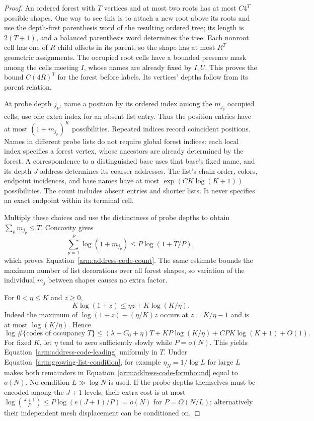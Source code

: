 \begin{proof}
An ordered forest with $T$ vertices and at most two roots has at most
$C4^T$ possible shapes.  One way to see this is to attach a new root
above its roots and use the depth-first parenthesis word of the
resulting ordered tree; its length is $2(T+1)$, and a balanced
parenthesis word determines the tree.  Each nonroot cell has one of
$R$ child offsets in its parent, so the shape has at most $R^T$
geometric assignments.  The occupied root cells have a bounded presence
mask among the cells meeting $I$, whose names are already fixed by
$I,U$.  This proves the bound $C(4R)^T$ for the forest before labels.
Its vertices' depths follow from its parent relation.

At probe depth $j_p$, name a position by its ordered index among the
$m_{j_p}$ occupied cells; use one extra index for an absent list entry.
Thus the position entries have at most $(1+m_{j_p})^K$ possibilities.
Repeated indices record coincident positions.  Names in different
probe lists do not require global forest indices: each local index
specifies a forest vertex, whose ancestors are already determined by
the forest.  A correspondence to a distinguished base uses that base's
fixed name, and its depth-$J$ address determines its coarser addresses.
The list's chain order, colors, endpoint incidences, and base names have
at most $\exp(CK\log(K+1))$ possibilities.  The count includes absent
entries and shorter lists.  It never specifies an exact endpoint
within its terminal cell.

Multiply these choices and use the distinctness of probe depths to
obtain $\sum_p m_{j_p}\leq T$.  Concavity gives
\[
 \sum_{p=1}^P\log(1+m_{j_p})
 \leq P\log(1+T/P),
\]
which proves Equation~\eqref{arm:address-code-count}.  The same estimate
bounds the maximum number of list decorations over all forest shapes,
so variation of the individual $m_j$ between shapes causes no extra
factor.

For $0<\eta\leq K$ and $z\geq0$,
\[
 K\log(1+z)\leq\eta z+K\log(K/\eta).
\]
Indeed the maximum of $\log(1+z)-(\eta/K)z$ occurs at
$z=K/\eta-1$ and is at most $\log(K/\eta)$.  Hence
\begin{equation}\label{arm:address-code-formbound}
 \log\#\{\text{codes of occupancy }T\}
 \leq(\lambda+C_0+\eta)T
   +KP\log(K/\eta)+CPK\log(K+1)+O(1).
\end{equation}
For fixed $K$, let $\eta$ tend to zero sufficiently slowly while
$P=o(N)$.  This yields Equation~\eqref{arm:address-code-leading}
uniformly in $T$.  Under Equation~\eqref{arm:growing-list-condition},
for example $\eta_N=1/\log L$ for large $L$ makes both remainders in
Equation~\eqref{arm:address-code-formbound} equal to $o(N)$.
No condition $L\gg\log N$ is used.  If the probe depths themselves
must be encoded among the $J+1$ levels, their extra cost is at most
$\log\binom{J+1}{P}\leq P\log(e(J+1)/P)=o(N)$ for
$P=O(N/L)$; alternatively their independent mesh displacement can be
conditioned on.


\end{proof}
